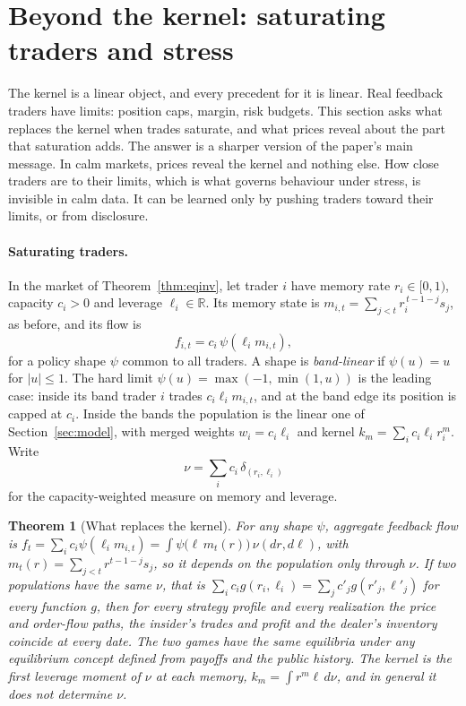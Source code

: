 \documentclass[12pt]{article}
\newtheorem{theorem}{Theorem}[section]
\theoremstyle{definition}
\theoremstyle{remark}
\begin{document}
\section{Beyond the kernel: saturating traders and stress}\label{sec:saturating}

The kernel is a linear object, and every precedent for it is linear. Real feedback traders have limits: position caps, margin, risk budgets. This section asks what replaces the kernel when trades saturate, and what prices reveal about the part that saturation adds. The answer is a sharper version of the paper's main message. In calm markets, prices reveal the kernel and nothing else. How close traders are to their limits, which is what governs behaviour under stress, is invisible in calm data. It can be learned only by pushing traders toward their limits, or from disclosure.

\paragraph{Saturating traders.} In the market of Theorem~\ref{thm:eqinv}, let trader $i$ have memory rate $r_i\in[0,1)$, capacity $c_i>0$ and leverage $\ell_i\in\mathbb R$. Its memory state is $m_{i,t}=\sum_{j<t}r_i^{\,t-1-j}s_j$, as before, and its flow is
\[
 f_{i,t}=c_i\,\psi(\ell_i m_{i,t}),
\]
for a policy shape $\psi$ common to all traders. A shape is \emph{band-linear} if $\psi(u)=u$ for $|u|\le1$. The hard limit $\psi(u)=\max(-1,\min(1,u))$ is the leading case: inside its band trader $i$ trades $c_i\ell_im_{i,t}$, and at the band edge its position is capped at $c_i$. Inside the bands the population is the linear one of Section~\ref{sec:model}, with merged weights $w_i=c_i\ell_i$ and kernel $k_m=\sum_ic_i\ell_ir_i^m$. Write
\[
 \nu=\sum_ic_i\,\delta_{(r_i,\ell_i)}
\]
for the capacity-weighted measure on memory and leverage.

\begin{theorem}[What replaces the kernel]\label{thm:satsuff}
For any shape $\psi$, aggregate feedback flow is $f_t=\sum_ic_i\psi(\ell_im_{i,t})=\int\psi\bigl(\ell\,m_t(r)\bigr)\,\nu(dr,d\ell)$, with $m_t(r)=\sum_{j<t}r^{t-1-j}s_j$, so it depends on the population only through $\nu$. If two populations have the same $\nu$, that is $\sum_ic_ig(r_i,\ell_i)=\sum_jc'_jg(r'_j,\ell'_j)$ for every function $g$, then for every strategy profile and every realization the price and order-flow paths, the insider's trades and profit and the dealer's inventory coincide at every date. The two games have the same equilibria under any equilibrium concept defined from payoffs and the public history. The kernel is the first leverage moment of $\nu$ at each memory, $k_m=\int r^m\ell\,d\nu$, and in general it does not determine $\nu$.
\end{theorem}
\end{document}
